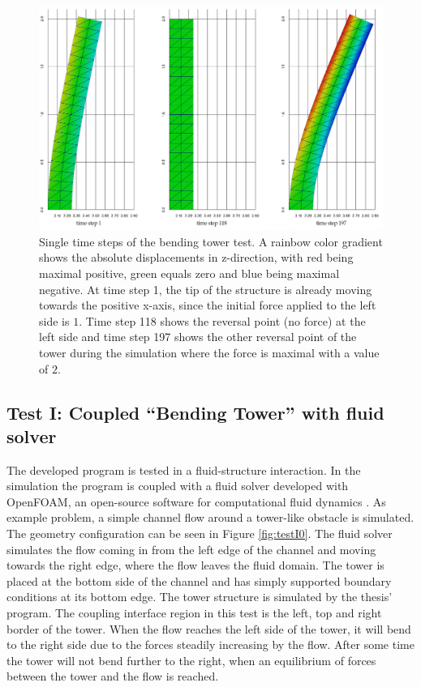     \begin{landscape}
     \begin{figure}[htbp]
      \centering
      \includegraphics[width=0.8\linewidth]{figures/frames}
      \caption{Single time steps of the bending tower test. A rainbow color gradient shows the absolute displacements in z-direction, with red being maximal positive, green equals zero and blue being maximal negative. At time step 1, the tip of the structure is already moving towards the positive x-axis, since the initial force applied to the left side is $1$. Time step 118 shows the reversal point (no force) at the left side and time step 197 shows the other reversal point of the tower during the simulation where the force is maximal with a value of $2$.}
      \label{fig:testHa2}
     \end{figure}
    \end{landscape}
  
 \subsection{Test I: Coupled ``Bending Tower'' with fluid solver}\label{sec:valid-I}
  The developed program is tested in a fluid-structure interaction. In the simulation the program is coupled with a fluid solver developed with OpenFOAM, an open-source software for computational fluid dynamics \cite{openfoam-url}. %
  As example problem, a simple channel flow around a tower-like obstacle is simulated. The geometry configuration can be seen in Figure \ref{fig:testI0}. The fluid solver simulates the flow coming in from the left edge of the channel and moving towards the right edge, where the flow leaves the fluid domain. The tower is placed at the bottom side of the channel and has simply supported boundary conditions at its bottom edge. The tower structure is simulated by the thesis' program. The coupling interface region in this test is the left, top and right border of the tower. When the flow reaches the left side of the tower, it will bend to the right side due to the forces steadily increasing by the flow. After some time the tower will not bend further to the right, when an equilibrium of forces between the tower and the flow is reached.
  
